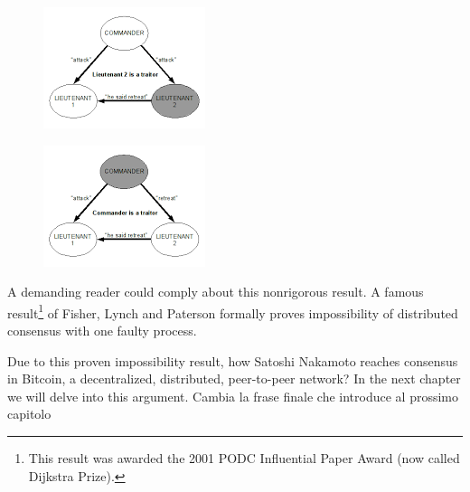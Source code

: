 \begin{figure}
\centering
\begin{minipage}{.5\textwidth}
  \centering
  \includegraphics[width=.8\linewidth]{Images/scenario1.png}
  \label{fig:scenario1}
\end{minipage}%
\begin{minipage}{.5\textwidth}
  \centering
  \includegraphics[width=.8\linewidth]{Images/scenario2.png}
  \label{fig:scenario2}
\end{minipage}
\end{figure}

\bigskip
\noindent
A demanding reader could comply about this nonrigorous result. A famous result\footnote{This result was awarded the 2001 PODC Influential Paper Award (now called Dijkstra Prize).} of Fisher, Lynch and Paterson \cite{Fischer:1985:IDC:3149.214121} formally proves impossibility of distributed consensus with one faulty process.

\bigskip
\noindent
Due to this proven impossibility result, how Satoshi Nakamoto reaches consensus in Bitcoin, a decentralized, distributed, peer-to-peer network? In the next chapter we will delve into this argument. Cambia la frase finale che introduce al prossimo capitolo